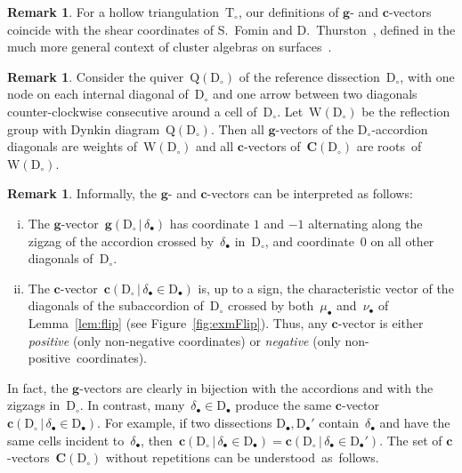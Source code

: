 \documentclass{amsart}
\theoremstyle{definition}
\newtheorem{remark}[theorem]{Remark}
\renewcommand{\b}[1]{\mathbf{#1}} %
\newcommand{\fref}[1]{Figure~\ref{#1}} %
\newcommand{\darkblue}{\color{darkblue}} %
\newcommand{\defn}[1]{\textsl{\darkblue #1}} %
\newcommand{\triangulation}{\mathrm{T}} %
\newcommand{\dissection}{\mathrm{D}} %
\newcommand{\gvector}[2]{\mathbf{g}(#1 \,|\, #2)} %
\newcommand{\cvector}[3]{\mathbf{c}(#1  \,|\, #3 \in #2)} %
\newcommand{\allcvectors}[1]{\mathbf{C}(#1)} %
\newcommand{\quiver}{\mathrm{Q}} %
\newcommand{\CoxeterGroup}{\mathrm{W}} %
\begin{document}
\begin{remark}
For a hollow triangulation~$\triangulation_\circ$, our definitions of $\b{g}$- and $\b{c}$-vectors coincide with the shear coordinates of S.~Fomin and D.~Thurston~\cite{FominThurston}, defined in the much more general context of cluster algebras on surfaces~\cite{FominShapiroThurston}.
\end{remark}

\begin{remark}
\label{rem:quiver}
Consider the quiver~$\quiver(\dissection_\circ)$ of the reference dissection~$\dissection_\circ$, with one node on each internal diagonal of~$\dissection_\circ$ and one arrow between two diagonals counter-clockwise consecutive around a cell of~$\dissection_\circ$. Let~$\CoxeterGroup(\dissection_\circ)$ be the reflection group with Dynkin diagram~$\quiver(\dissection_\circ)$. Then all $\b{g}$-vectors of the $\dissection_\circ$-accordion diagonals are weights of~$\CoxeterGroup(\dissection_\circ)$ and all $\b{c}$-vectors of~$\allcvectors{\dissection_\circ}$ are roots~of~$\CoxeterGroup(\dissection_\circ)$.
\end{remark}

\begin{remark}
\label{rem:informalgcvectors}
Informally, the $\b{g}$- and $\b{c}$-vectors can be interpreted as follows:
\begin{enumerate}[(i)]
\item The $\b{g}$-vector~$\gvector{\dissection_\circ}{\delta_\bullet}$ has coordinate $1$ and $-1$ alternating along the zigzag of the accordion crossed by~$\delta_\bullet$ in~$\dissection_\circ$, and coordinate~$0$ on all other diagonals of~$\dissection_\circ$.
\item The $\b{c}$-vector~$\cvector{\dissection_\circ}{\dissection_\bullet}{\delta_\bullet}$ is, up to a sign, the characteristic vector of the diagonals 
of the subaccordion of~$\dissection_\circ$ crossed by both~$\mu_\bullet$ and~$\nu_\bullet$ of Lemma~\ref{lem:flip} (see \fref{fig:exmFlip}). Thus, any $\b{c}$-vector is either \defn{positive} (only non-negative coordinates) or \defn{negative} (only non-positive~coordinates).
\end{enumerate}
\end{remark}

In fact, the $\b{g}$-vectors are clearly in bijection with the accordions and with the zigzags in~$\dissection_\circ$. In contrast, many~$\delta_\bullet \in \dissection_\bullet$ produce the same $\b{c}$-vector ${\cvector{\dissection_\circ}{\dissection_\bullet}{\delta_\bullet}}$. For example, if two dissections $\dissection_\bullet, \dissection_\bullet'$ contain~$\delta_\bullet$ and have the same cells incident to~$\delta_\bullet$, then~${\cvector{\dissection_\circ}{\dissection_\bullet}{\delta_\bullet} = \cvector{\dissection_\circ}{\dissection_\bullet'}{\delta_\bullet}}$. The set of $\b{c}$-vectors~$\allcvectors{\dissection_\circ}$ without repetitions can be understood~as~follows.
\end{document}
